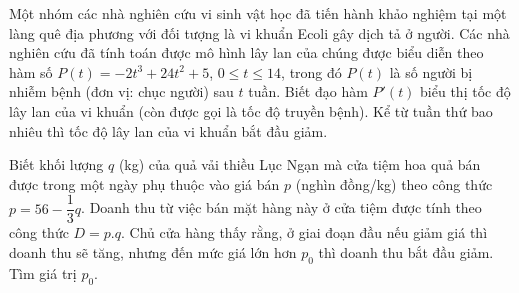 \begin{bt}%
	Một nhóm các nhà nghiên cứu vi sinh vật học đã tiến hành khảo nghiệm tại một làng quê địa phương với đối tượng là vi khuẩn Ecoli gây dịch tả ở người. Các nhà nghiên cứu đã tính toán được mô hình lây lan của chúng được biểu diễn theo hàm số $P\left(t \right)=-2t^3+24t^2+5$, $0\le t\le 14$, trong đó $P(t)$ là số người bị nhiễm bệnh (đơn vị: chục người) sau $t$ tuần. Biết đạo hàm $P'\left(t \right)$ biểu thị tốc độ lây lan của vi khuẩn (còn được gọi là tốc độ truyền bệnh). Kể từ tuần thứ bao nhiêu thì tốc độ lây lan của vi khuẩn bắt đầu giảm.
\end{bt}

\begin{bt}%
	Biết khối lượng $q$ (kg) của quả vải thiều Lục Ngạn mà cửa tiệm hoa quả bán được trong một ngày phụ thuộc vào giá bán $p$ (nghìn đồng/kg) theo công thức $p=56-\dfrac{1}{3}q$. Doanh thu từ việc bán mặt hàng này ở cửa tiệm được tính theo công thức $D=p.q$. Chủ cửa hàng thấy rằng, ở giai đoạn đầu nếu giảm giá thì doanh thu sẽ tăng, nhưng đến mức giá lớn hơn $p_0$ thì doanh thu bắt đầu giảm. Tìm giá trị $p_0$.
\end{bt}

